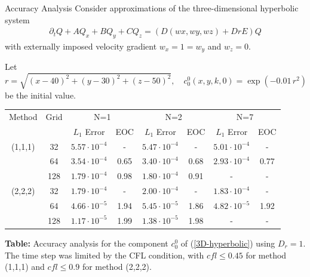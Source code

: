     \begin{frame}{Accuracy Analysis}
    	\scriptsize
    	Consider approximations of the three-dimensional hyperbolic
    	system
    	\begin{align}
    		    	\partial_tQ + AQ_x + BQ_y + CQ_z = (D(wx, wy,wz) + DrE)Q \label{3D-hyperbolic}
    	\end{align}
        with externally imposed velocity gradient $w_x=1=w_y$ and $w_z=0$.
 
    	Let 
    	\[
    	r = \sqrt{(x-40)^2+(y-30)^2+(z-50)^2}, \quad
    	c^0_0(x, y, k, 0) = \exp(-0.01 \, r^2)
    	\] 
    	be the initial value.
    	
    	\medskip
    	\centering
    	\begin{tabular}{|c|c|c|c|c|c|c|c|}
    		\hline
    		Method & Grid & \multicolumn{2}{c|}{N=1} & \multicolumn{2}{c|}{N=2} & \multicolumn{2}{c|}{N=7} \\
    		\cline{3-8}
    		&  & $L_1$ Error & EOC & $L_1$ Error & EOC & $L_1$ Error & EOC \\
    		\hline
    		(1,1,1) & 32  & $5.57\cdot10^{-4}$ & -    & $5.47\cdot10^{-4}$ & -    & $5.01 \cdot10^{-4} $ & - \\
    		& 64  & $3.54\cdot10^{-4}$ & 0.65 & $3.40\cdot10^{-4}$ & 0.68 & $2.93\cdot10^{-4}$ & $0.77$ \\
    		& 128 & $1.79\cdot10^{-4}$ & 0.98 & $1.80\cdot10^{-4}$ & 0.91 & - & - \\
    		\hline
    		(2,2,2) & 32  & $1.79\cdot10^{-4}$ & -    & $2.00\cdot10^{-4}$ & -    & $1.83\cdot10^{-4}$ & - \\
    		& 64  & $4.66\cdot10^{-5}$ & 1.94 & $5.45\cdot10^{-5}$ & 1.86 & $4.82\cdot10^{-5}$ & 1.92 \\
    		& 128 & $1.17\cdot10^{-5}$ & 1.99 & $1.38\cdot10^{-5}$ & 1.98 & - & - \\
    		\hline
    	\end{tabular}
    
    	\vspace{0.5em}
    	\footnotesize{
    		\textbf{Table:} Accuracy analysis for the component $c^0_0$ of (\ref{3D-hyperbolic}) using $D_r=1$. The time step was limited by the CFL condition, with $cfl \le 0.45$ for method (1,1,1) and $cfl \le 0.9$ for method (2,2,2).  
    	}
    \end{frame}
    
    
    
